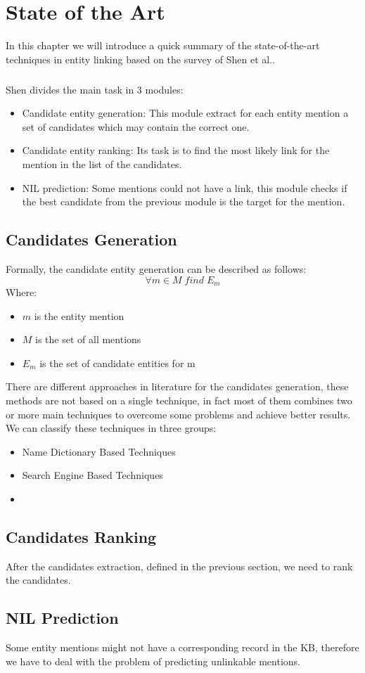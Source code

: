 \chapter{State of the Art}
In this chapter we will introduce a quick summary of the state-of-the-art techniques in entity linking based on the survey of Shen et al.\cite{shen2015entity}.
\paragraph{}
Shen \cite{shen2015entity} divides the main task in 3 modules:
\begin{itemize}
\item Candidate entity generation: This module extract for each entity mention a set of candidates which may contain the correct one.
\item Candidate entity ranking: Its task is to find the most likely link for the mention in the list of the candidates.
\item NIL prediction: Some mentions could not have a link, this module checks if the best candidate from the previous module is the target for the mention. 
\end{itemize}

\section{Candidates Generation}
Formally, the candidate entity generation can be described as follows:
\[\forall m \in M \; find \; E_m\]
Where:

\begin{itemize}[noitemsep,  topsep=10pt]
\item $m$ is the entity mention
\item $M$ is the set of all mentions
\item $E_m$ is the set of candidate entities for m
\end{itemize}

There are different approaches in literature for the candidates generation, these methods are not based on a single technique, in fact most of them combines two or more main techniques to overcome some problems and achieve better results. We can classify these techniques in three groups:
\begin{itemize}[noitemsep,  topsep=10pt]
\item Name Dictionary Based Techniques
\item Search Engine Based Techniques
\item 
\end{itemize}

\section{Candidates Ranking}
After the candidates extraction, defined in the previous section, we need to rank the candidates.

\section{NIL Prediction}
Some entity mentions might not have a corresponding record in the KB, therefore we have to deal with the problem of predicting unlinkable mentions. 